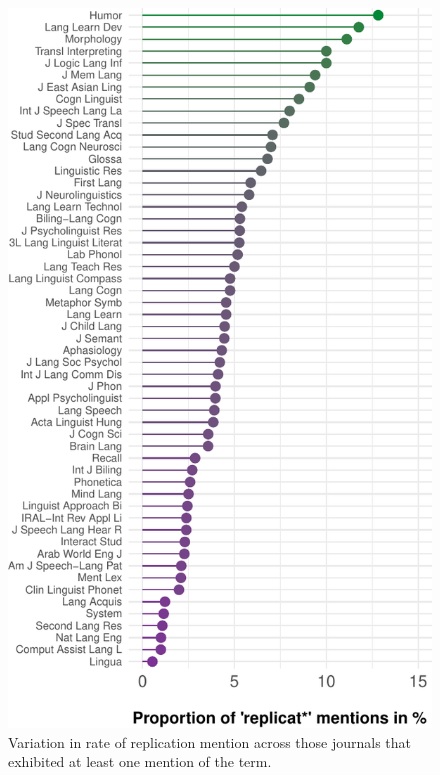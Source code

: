 \documentclass[]{elsarticle} %
\begin{document}
\begin{figure}

{\centering \includegraphics[width=1\linewidth]{ReplicationLing_files/figure-latex/topten_plot-1} 

}

\caption{Variation in rate of replication mention across those journals that exhibited at least one mention of the term.}\label{fig:topten_plot}
\end{figure}
\end{document}
